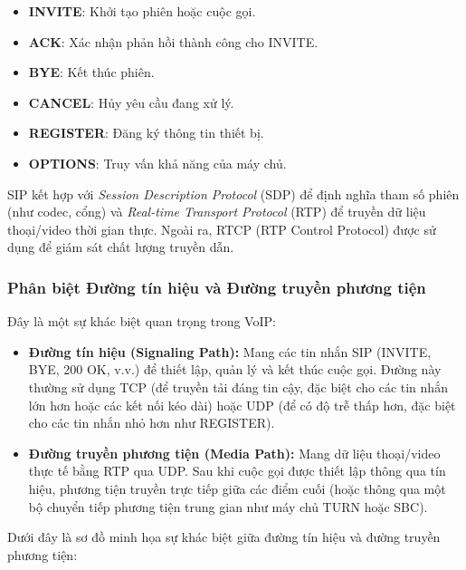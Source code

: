\begin{itemize}
\item \textbf{INVITE}: Khởi tạo phiên hoặc cuộc gọi.
\item \textbf{ACK}: Xác nhận phản hồi thành công cho INVITE.
\item \textbf{BYE}: Kết thúc phiên.
\item \textbf{CANCEL}: Hủy yêu cầu đang xử lý.
\item \textbf{REGISTER}: Đăng ký thông tin thiết bị.
\item \textbf{OPTIONS}: Truy vấn khả năng của máy chủ.
\end{itemize}

SIP kết hợp với \textit{Session Description Protocol} (SDP) để định nghĩa tham số phiên (như codec, cổng) và \textit{Real-time Transport Protocol} (RTP) để truyền dữ liệu thoại/video thời gian thực. Ngoài ra, RTCP (RTP Control Protocol) được sử dụng để giám sát chất lượng truyền dẫn.

\subsubsection{Phân biệt Đường tín hiệu và Đường truyền phương tiện}
\label{subsubsec:sip_paths}

Đây là một sự khác biệt quan trọng trong VoIP:

\begin{itemize}
\item \textbf{Đường tín hiệu (Signaling Path):} Mang các tin nhắn SIP (INVITE, BYE, 200 OK, v.v.) để thiết lập, quản lý và kết thúc cuộc gọi. Đường này thường sử dụng TCP (để truyền tải đáng tin cậy, đặc biệt cho các tin nhắn lớn hơn hoặc các kết nối kéo dài) hoặc UDP (để có độ trễ thấp hơn, đặc biệt cho các tin nhắn nhỏ hơn như REGISTER).
\item \textbf{Đường truyền phương tiện (Media Path):} Mang dữ liệu thoại/video thực tế bằng RTP qua UDP. Sau khi cuộc gọi được thiết lập thông qua tín hiệu, phương tiện truyền trực tiếp giữa các điểm cuối (hoặc thông qua một bộ chuyển tiếp phương tiện trung gian như máy chủ TURN hoặc SBC).
\end{itemize}

Dưới đây là sơ đồ minh họa sự khác biệt giữa đường tín hiệu và đường truyền phương tiện:

